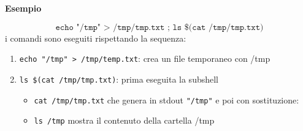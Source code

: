 \begin{flushleft}
  \textbf{Esempio}\par 
  $$\texttt{echo "/tmp" > /tmp/tmp.txt ; ls \$(cat /tmp/tmp.txt)}$$
  i comandi sono eseguiti rispettando la sequenza:
  \begin{enumerate}
    \item \texttt{echo "/tmp" > /tmp/temp.txt}: crea un file temporaneo con /tmp
    \item \texttt{ls \$(cat /tmp/tmp.txt)}: \ace prima eseguita la subshell 
          \begin{itemize}
            \item \texttt{cat /tmp/tmp.txt} che genera in stdout \texttt{"/tmp"} e poi con sostituzione:
            \item \texttt{ls /tmp} mostra il contenuto della cartella /tmp
          \end{itemize}
  \end{enumerate}
\end{flushleft}
